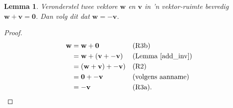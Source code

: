 \documentclass[a4paper,11pt]{book}
\newtheorem{lemma}[theorem]{Lemma}
\theoremstyle{definition}
\newcommand{\ve}[1]{\mathbf{#1}}
\begin{document}
\begin{lemma} Veronderstel twee vektore $\ve{w}$ en  $\ve{v}$ in 'n
	vektor-ruimte bevredig $\ve{w} + \ve{v} = \ve{0}$. Dan volg dit dat
	$\ve{w} = -\ve{v}$.
\end{lemma}
\begin{proof}
\begin{align*}
	\ve{w} &= \ve{w} + \ve{0} && \mbox{(R3b)} \\
	&= \ve{w} + (\ve{v} + -\ve{v}) && \mbox{(Lemma \ref{add_inv})} \\
	&= (\ve{w} + \ve{v}) + -\ve{v}) && \mbox{(R2)} \\
	&= \ve{0} + -\ve{v} && \mbox{(volgens aanname)} \\
	&= -\ve{v} && \mbox{(R3a)}.
\end{align*}
\end{proof}
\end{document}

